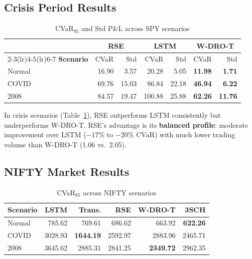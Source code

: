 \documentclass[11pt]{article}
\begin{document}
\subsection{Crisis Period Results}

\begin{table}[t]
\centering
\caption{CVaR$_{95}$ and Std P\&L across SPY scenarios}
\label{tab:crisis}
\small
\begin{tabular}{@{}l rr rr rr@{}}
\toprule
& \multicolumn{2}{c}{\textbf{RSE}} & \multicolumn{2}{c}{\textbf{LSTM}} & \multicolumn{2}{c}{\textbf{W-DRO-T}} \\
\cmidrule(lr){2-3}\cmidrule(lr){4-5}\cmidrule(lr){6-7}
\textbf{Scenario} & CVaR & Std & CVaR & Std & CVaR & Std \\
\midrule
Normal & 16.90 & 3.57 & 20.28 & 5.05 & \textbf{11.98} & \textbf{1.71} \\
COVID & 69.76 & 15.03 & 86.84 & 22.18 & \textbf{46.94} & \textbf{6.22} \\
2008 & 84.57 & 19.47 & 100.88 & 25.88 & \textbf{62.26} & \textbf{11.76} \\
\bottomrule
\end{tabular}
\end{table}

In crisis scenarios (Table~\ref{tab:crisis}), RSE outperforms LSTM consistently but underperforms W-DRO-T. RSE's advantage is its \textbf{balanced profile}: moderate improvement over LSTM ($-17\%$ to $-20\%$ CVaR) with much lower trading volume than W-DRO-T (1.06 vs.\ 2.05).

\subsection{NIFTY Market Results}

\begin{table}[t]
\centering
\caption{CVaR$_{95}$ across NIFTY scenarios}
\label{tab:nifty}
\small
\begin{tabular}{lrrrrr}
\toprule
\textbf{Scenario} & \textbf{LSTM} & \textbf{Trans.} & \textbf{RSE} & \textbf{W-DRO-T} & \textbf{3SCH} \\
\midrule
Normal & 785.62 & 769.61 & 686.62 & 663.92 & \textbf{622.26} \\
COVID & 3028.93 & \textbf{1644.19} & 2592.97 & 2883.96 & 2465.71 \\
2008 & 3645.62 & 2885.31 & 2841.25 & \textbf{2349.72} & 2962.35 \\
\bottomrule
\end{tabular}
\end{table}
\end{document}
